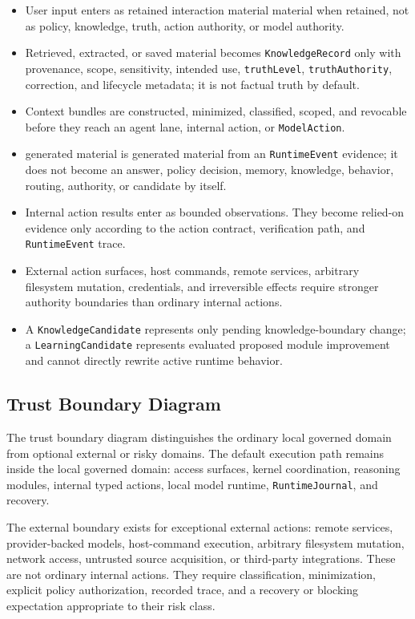 \begin{itemize}
	\item User input enters as retained interaction material material when retained, not as policy, knowledge, truth, action authority, or model authority.
	\item Retrieved, extracted, or saved material becomes \texttt{KnowledgeRecord} only with provenance, scope, sensitivity, intended use, \texttt{truthLevel}, \texttt{truthAuthority}, correction, and lifecycle metadata; it is not factual truth by default.
	\item Context bundles are constructed, minimized, classified, scoped, and revocable before they reach an agent lane, internal action, or \texttt{ModelAction}.
	\item generated material is generated material from an \texttt{RuntimeEvent} evidence; it does not become an answer, policy decision, memory, knowledge, behavior, routing, authority, or candidate by itself.
	\item Internal action results enter as bounded observations. They become relied-on evidence only according to the action contract, verification path, and \texttt{RuntimeEvent} trace.
	\item External action surfaces, host commands, remote services, arbitrary filesystem mutation, credentials, and irreversible effects require stronger authority boundaries than ordinary internal actions.
	\item A \texttt{KnowledgeCandidate} represents only pending knowledge-boundary change; a \texttt{LearningCandidate} represents evaluated proposed module improvement and cannot directly rewrite active runtime behavior.
	\end{itemize}

\subsection{Trust Boundary Diagram}

The trust boundary diagram distinguishes the ordinary local governed domain from optional external or risky domains. The default execution path remains inside the local governed domain: access surfaces, kernel coordination, reasoning modules, internal typed actions, local model runtime, \texttt{RuntimeJournal}, and recovery.

The external boundary exists for exceptional external actions: remote services, provider-backed models, host-command execution, arbitrary filesystem mutation, network access, untrusted source acquisition, or third-party integrations. These are not ordinary internal actions. They require classification, minimization, explicit policy authorization, recorded trace, and a recovery or blocking expectation appropriate to their risk class.

